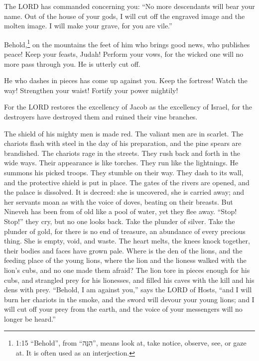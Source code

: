 \myverse{}The LORD has commanded concerning you: “No more descendants will
bear your name. Out of the house of your gods, I will cut off the engraved image and the molten image.
I will make your grave, for you are vile.”

\myverse{}Behold,\footnote{1:15 “Behold”, from “הִנֵּה”, means look at, take notice, observe, see, or gaze at. It is
	often used as an interjection.} on the mountains the feet of him who brings good news, who publishes
peace! Keep your feasts, Judah! Perform your vows, for the wicked one will no more pass through you. He
is utterly cut off.


\mychapter{} \myverse*{}He who dashes in pieces has come up against you. Keep the fortress!
Watch the way! Strengthen your waist! Fortify your power mightily!

\myverse{}For the LORD restores the excellency of Jacob as the excellency
of Israel, for the destroyers have destroyed them and ruined their vine branches.

\myverse{}The shield of his mighty men is made red. The valiant men are in
scarlet. The chariots flash with steel in the day of his preparation, and the pine spears are brandished.
\myverse{}The chariots rage in the streets. They rush back and forth in the wide ways.
Their appearance is like torches. They run like the lightnings.
\myverse{}He summons his picked troops. They stumble on their way. They dash to its wall,
and the protective shield is put in place.
\myverse{}The gates of the rivers are opened, and the palace is dissolved.
\myverse{}It is decreed: she is uncovered, she is carried away; and her servants moan
as with the voice of doves, beating on their breasts.
\myverse{}But Nineveh has been from of old like a pool of water, yet they flee away. “Stop!
Stop!” they cry, but no one looks back.
\myverse{}Take the plunder of silver. Take the plunder of gold, for there is no end of
treasure, an abundance of every precious thing.
\myverse{}She is empty, void, and waste. The heart melts, the knees knock together,
their bodies and faces have grown pale.
\myverse{}Where is the den of the lions, and the feeding place of the young lions, where
the lion and the lioness walked with the lion’s cubs, and no one made them afraid?
\myverse{}The lion tore in pieces enough for his cubs, and strangled prey for his lionesses,
and filled his caves with the kill and his dens with prey.
\myverse{}“Behold, I am against you,” says the LORD of Hosts, “and I will burn her chariots
in the smoke, and the sword will devour your young lions; and I will cut off your prey from the earth,
and the voice of your messengers will no longer be heard.”


